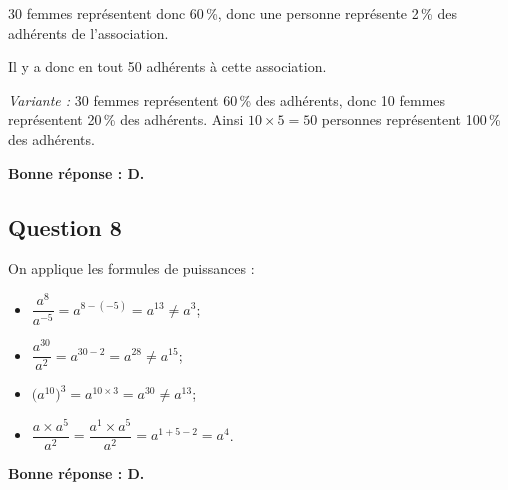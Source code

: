 \documentclass[10pt]{article}
\begin{document}
	30 femmes représentent donc 60\,\%, donc une personne représente 2\,\% des adhérents de l'association.

	Il y a donc en tout 50 adhérents à cette association.

	\emph{Variante :} 30 femmes représentent 60\,\% des adhérents, donc 10 femmes représentent 20\,\% des adhérents. Ainsi $10 \times 5 = 50$ personnes représentent 100\,\% des adhérents.

	\textbf{Bonne réponse : D.}

\subsection*{Question 8}
	On applique les formules de puissances :
	\begin{itemize}
		\item $\dfrac{a^8}{a^{-5}} = a^{8 - (-5)} = a^{13} \neq a^3$;
		\item $\dfrac{a^{30}}{a^2} = a^{30 - 2} = a^{28} \neq a^{15}$;
		\item $\big(a^{10}\big)^3 = a^{10 \times 3} = a^{30} \neq a^{13}$;
		\item $\dfrac{a\times a^5}{a^2} = \dfrac{a^1\times a^5}{a^2} = a^{1 + 5 - 2} = a^4$.
	\end{itemize}

	\textbf{Bonne réponse : D.}

\end{document}
